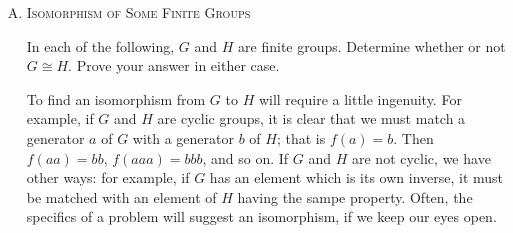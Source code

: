 \documentclass[twoside]{amsart}
\newcommand{\solution}{\textsc{Solution}\xspace}
\newcommand{\iso}{\cong}
\newcommand{\blank}{\vspace{5pt}}
\begin{document}
\begin{enumerate}[A.]
\begin{enumerate}[(i)]
\begin{enumerate}[1.]
			\item Prove the for each element $a$ in $G_1$, $f(a^{-1})
			= [f(a)]^{-1}$. (\textsc{Hint}: You may use Theorem 2 of 
			Chapter 4.)

			\setcounter{equation}{0}
			\blank \noindent \solution 
			\begin{align}
				f(aa^{-1}) &= f(e)          && \text{Inverses} \\
				f(aa^{-1}) &= f(a)f(a^{-1}) && \text{Isomorphism} \\
				f(e)       &= f(a)f(a^{-1}) && \text{(2) and (3)} \\
				f(a^{-1})  &= [f(a)]^{-1}   && \text{Theorem 2 of Chap 4 (3)}
			\end{align}

			\item If $G_1$ is a cyclic group with generator $a$, prove
			that $G_2$ is also a cyclic group, with generator $f(a)$.

			\blank \noindent \solution Choose any element $y \in G_2$. 
			Let $x = f^{-1}(y)$. We know that $x = a^n$ for some value of $n$.
			If $n=0$ then we have $y = f(e_1) = e_2 = [f(a)]^0$.
			If $n>0$ then $y = f(a^n) = \underbrace{f(a)f(a)\cdots f(a)}_{n
			\text{ times}} = [f(a)]^n$. Finally, if $n<0$ then
			$y = f(a^n) = \underbrace{f(a^{-1})f(a^{-1})\cdots f(a^{-1})}_{-n
			\text{ times}} = [f(a^{-1})]^{-n}$. From part 2 we know that
			$f(a^{-1}) = [f(a)]^{-1}$. Therefore 
			$[f(a^{-1})]^{-n} = ([f(a)]^{-1})^{-n}$. For each value of
			$n$ we have shown how to generate $y$ from $f(a)$. And since,
			$y$ was an arbitrary element of $G_2$ this means any element
			of $G_2$ can be generated from $f(a)$. Therefore,
			$G_2$ is a cyclic group with generator $f(a)$.

		\end{enumerate}

	\end{enumerate}

   \blank
	\item \textsc{Isomorphism of Some Finite Groups}

	In each of the following, $G$ and $H$ are finite groups. Determine whether 
	or not $G \iso H$. Prove your answer in either case.

	To find an isomorphism from $G$ to $H$ will require a little 
	ingenuity. For example, if $G$ and $H$ are cyclic groups, it is clear
	that we must match a generator $a$ of $G$ with a generator $b$ of
	$H$; that is $f(a)=b$. Then $f(aa)=bb$, $f(aaa)=bbb$, and so on. If
	$G$ and $H$ are not cyclic, we have other ways: for example, if 
	$G$ has an element which is its own inverse, it must be matched with
	an element of $H$ having the sampe property. Often, the specifics of a
	problem will suggest an isomorphism, if we keep our eyes open.


\end{enumerate}
\end{document}
